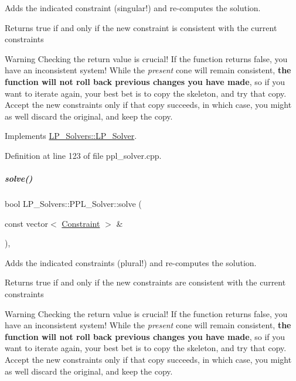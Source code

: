 Adds the indicated constraint (singular!) and re-\/computes the solution. 

\begin{DoxyReturn}{Returns}
{\ttfamily true} if and only if the new constraint is consistent with the current constraints
\end{DoxyReturn}
\begin{DoxyWarning}{Warning}
Checking the return value is crucial! If the function returns {\ttfamily false}, you have an inconsistent system! While the {\itshape present} cone will remain consistent, {\bfseries the function will not roll back previous changes you have made}, so if you want to iterate again, your best bet is to copy the skeleton, and try that copy. Accept the new constraints only if that copy succeeds, in which case, you might as well discard the original, and keep the copy. 
\end{DoxyWarning}


Implements \hyperlink{group___c_l_s_solvers_a8b9979fb228ac9ccfe037ad6ca48b314}{L\+P\+\_\+\+Solvers\+::\+L\+P\+\_\+\+Solver}.



Definition at line 123 of file ppl\+\_\+solver.\+cpp.

\mbox{\label{group___c_l_s_solvers_a3763d4bc551a98546f1f5be4df49390d}} 
\subparagraph{\texorpdfstring{solve()}{solve()}\hspace{0.1cm}{\footnotesize\ttfamily [2/2]}}
{\footnotesize\ttfamily bool L\+P\+\_\+\+Solvers\+::\+P\+P\+L\+\_\+\+Solver\+::solve (\begin{DoxyParamCaption}\item[{const vector$<$ \hyperlink{group___c_l_s_solvers_class_l_p___solvers_1_1_constraint}{Constraint} $>$ \&}]{ }\end{DoxyParamCaption})\hspace{0.3cm}{\ttfamily [override]}, {\ttfamily [virtual]}}



Adds the indicated constraints (plural!) and re-\/computes the solution. 

\begin{DoxyReturn}{Returns}
{\ttfamily true} if and only if the new constraints are consistent with the current constraints
\end{DoxyReturn}
\begin{DoxyWarning}{Warning}
Checking the return value is crucial! If the function returns {\ttfamily false}, you have an inconsistent system! While the {\itshape present} cone will remain consistent, {\bfseries the function will not roll back previous changes you have made}, so if you want to iterate again, your best bet is to copy the skeleton, and try that copy. Accept the new constraints only if that copy succeeds, in which case, you might as well discard the original, and keep the copy. 
\end{DoxyWarning}


